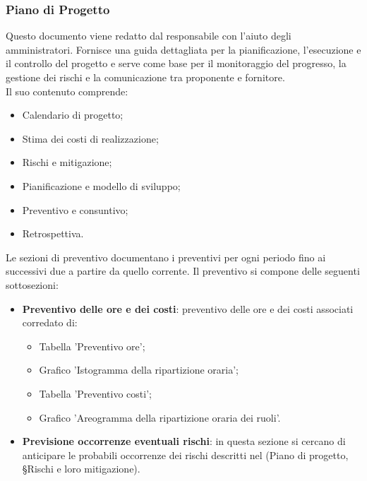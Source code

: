 \documentclass[10pt, a4paper]{article}
\begin{document}
\subsubsection{Piano di Progetto }
Questo documento viene redatto dal responsabile con l'aiuto degli amministratori. Fornisce una guida dettagliata per la pianificazione, 
l'esecuzione e il controllo del progetto e serve come base per il monitoraggio del progresso, la gestione dei rischi e la comunicazione tra
proponente e fornitore.\\ 
Il suo contenuto comprende:
\begin{itemize}
    \item Calendario di progetto;
    \item Stima dei costi di realizzazione;
    \item Rischi e mitigazione;
    \item Pianificazione e modello di sviluppo;
    \item Preventivo e consuntivo;
    \item Retrospettiva.
\end{itemize}
Le sezioni di preventivo documentano i preventivi per ogni periodo fino ai successivi due a partire da quello corrente. Il preventivo si compone delle seguenti sottosezioni:
\begin{itemize}
    \item \textbf{Preventivo delle ore e dei costi}: preventivo delle ore e dei costi associati corredato di:
    \begin{itemize}
        \item Tabella 'Preventivo ore';
        \item Grafico 'Istogramma della ripartizione oraria';
        \item Tabella 'Preventivo costi';
        \item Grafico 'Areogramma della ripartizione oraria dei ruoli'.
    \end{itemize} 
    \item \textbf{Previsione occorrenze eventuali rischi}: in questa sezione si cercano di anticipare le probabili occorrenze dei rischi descritti nel (Piano di progetto, \S Rischi e loro mitigazione).
  
\end{itemize}
\end{document}
